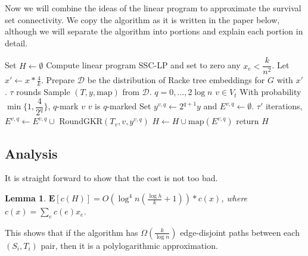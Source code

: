 \documentclass[12pt]{article}
\newtheorem{lemma}{Lemma}
\begin{document}
Now we will combine the ideas of the linear program to approximate the survival set connectivity. We copy the algorithm as it is written in the paper below, although we will separate the algorithm into portions and explain each portion in detail.
\begin{codebox}
\li Set $H \leftarrow \emptyset$
\li Compute linear program SSC-LP and set to zero any $x_e < \dfrac{k}{n^2}$.
\li Let $x' \leftarrow x*\frac{4}{k}$. 
\li Prepare $\mathcal{D}$ be the distribution of Racke tree embeddings for $G$ with $x'$.
\li \For $\tau$ rounds \Do
\li Sample $(T, y, \text{map})$ from $\mathcal{D}$. 
\li \For $q = 0, ..., 2\log n$ \Do
\li \For $v \in V_t$ \Do
\li With probability $\min\{1, \dfrac{4}{2^q}\}$, $q$-mark $v$
\li \If $v$ is $q$-marked \Then
\li Set $y^{v, q}\leftarrow 2^{q+1}y$ and $E^{v,q} \leftarrow \emptyset$.
\li \For $\tau'$ iterations, \Do
\li $E^{v,q} \leftarrow E^{v,q} \cup$ RoundGKR$(T_v, v, y^{v,q})$ \End
\li $H \leftarrow H \cup \text{map}(E^{v,q})$ \End \End \End \End
\li return $H$
\end{codebox}

\subsection{Analysis}

It is straight forward to show that the cost is not too bad.

\begin{lemma}
$\textbf{E}[c(H)] = O(\log^4n(\frac{\log h}{k}+1)) * c(x)$, where $c(x) = \sum_e c(e)x_e$. 
\end{lemma}
This shows that if the algorithm has $\Omega(\frac{k}{\log n})$ edge-disjoint paths between each $(S_i, T_i)$ pair, then it is a polylogarithmic approximation. 
\end{document}
